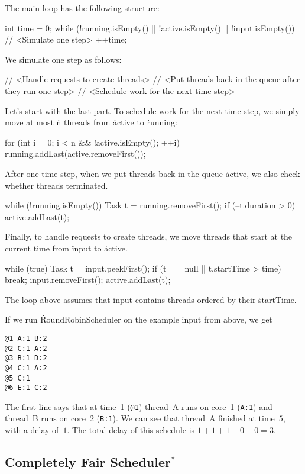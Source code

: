 The main loop has the following structure:
\begin{ccode}
int time = 0;
while (!running.isEmpty() || !active.isEmpty() || !input.isEmpty()) {
  // <Simulate one step>
  ++time;
}
\end{ccode}
We simulate one step as follows:
\begin{ccode}
// <Handle requests to create threads>
// <Put threads back in the queue after they run one step>
// <Schedule work for the next time step>
\end{ccode}
Let's start with the last part.
To schedule work for the next time step,
  we simply move at most \.{n} threads from \.{active} to \.{running}:
\begin{ccode}
for (int i = 0; i < n && !active.isEmpty(); ++i)
  running.addLast(active.removeFirst());
\end{ccode}
After one time step, when we put threads back in the queue \.{active},
  we also check whether threads terminated.
\begin{ccode}
while (!running.isEmpty()) {
  Task t = running.removeFirst();
  if (--t.duration > 0) active.addLast(t);
}
\end{ccode}
Finally, to handle requests to create threads,
  we move threads that start at the current time from \.{input} to \.{active}.
\begin{ccode}
while (true) {
  Task t = input.peekFirst();
  if (t == null || t.startTime > time) break;
  input.removeFirst();
  active.addLast(t);
}
\end{ccode}
The loop above assumes that \.{input} contains threads ordered by their \.{startTime}.

If we run \.{RoundRobinScheduler} on the example input from above, we get
\begin{verbatim}
@1 A:1 B:2
@2 C:1 A:2
@3 B:1 D:2
@4 C:1 A:2
@5 C:1
@6 E:1 C:2
\end{verbatim}
The first line says that at time~1 ({\tt @1})
  thread~A runs on core~1 ({\tt A:1}) and
  thread~B runs on core~2 ({\tt B:1}).
We can see that thread~A finished at time~$5$, with a delay of~$1$.
The total delay of this schedule is $1+1+1+0+0=3$.

\subsection*{Completely Fair Scheduler${}^\ast$}

